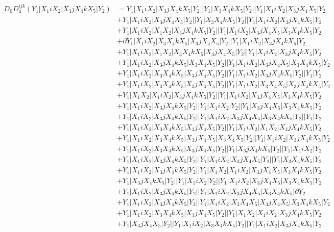 \documentclass{article}[12pt]
\begin{document}
\begin{align*}
D_0 D_3^{ijk}(Y_1|X_1iX_2|X_3jX_4kX_5|Y_2)& =Y_1|X_1iX_2|X_3jX_4kX_5|Y_2||Y_1|X_3X_4kX_5|Y_2||Y_1|X_1iX_2|X_3jX_4X_5|Y_2\\ 
 & +Y_1|X_1iX_2|X_3jX_4X_5|Y_2||Y_1|X_3X_4kX_5|Y_2||Y_1|X_1iX_2|X_3jX_4kX_5|Y_2\\ 
 & +Y_1|X_1iX_2|X_1X_2|X_3jX_4kX_5|Y_2||Y_1|X_1iX_2|X_3jX_4X_5|X_3X_4kX_5|Y_2\\ 
 & +\partial Y_1|X_1iX_2|X_3X_4kX_5|X_3jX_4X_5|Y_2||Y_1|X_1iX_2|X_3jX_4kX_5|Y_2\\ 
 & +Y_1|X_1iX_2|X_1X_2|X_3X_4kX_5|X_3jX_4X_5|Y_2||Y_1|X_1iX_2|X_3jX_4kX_5|Y_2\\ 
 & +Y_1|X_1iX_2|X_3jX_4kX_5|X_3X_4X_5|Y_2||Y_1|X_1iX_2|X_3jX_4X_5|X_3X_4kX_5|Y_2\\ 
 & +Y_1|X_1iX_2|X_3X_4kX_5|X_3jX_4X_5|Y_2||Y_1|X_1iX_2|X_3jX_4kX_5|Y_2||Y_1|Y_2\\ 
 & +Y_1|X_1iX_2|X_3X_4kX_5|X_3jX_4X_5|Y_2||Y_1|X_1iX_2|X_3X_4X_5|X_3jX_4kX_5|Y_2\\ 
 & +Y_1|X_1X_2|X_1iX_2|X_3jX_4kX_5|Y_2||Y_1|X_1iX_2|X_3jX_4X_5|X_3X_4kX_5|Y_2\\ 
 & +Y_1|X_1iX_2|X_3jX_4kX_5|Y_2||Y_1|X_1iX_2|Y_2||Y_1|X_3jX_4X_5|X_3X_4kX_5|Y_2\\ 
 & +Y_1|X_1iX_2|X_3jX_4kX_5|Y_2||Y_1|X_1iX_2|X_3jX_4X_5|X_3X_4kX_5|Y_2||Y_1|Y_2\\ 
 & +Y_1|X_1iX_2|X_3X_4kX_5|X_3jX_4X_5|Y_2||Y_1|X_1iX_2|X_1X_2|X_3jX_4kX_5|Y_2\\ 
 & +Y_1|X_1iX_2|X_3X_4kX_5|X_3jX_4X_5|X_3X_4X_5|Y_2||Y_1|X_1iX_2|X_3jX_4kX_5|Y_2\\ 
 & +Y_1|X_1iX_2|X_3X_4kX_5|X_3jX_4X_5|Y_2||Y_1|X_3jX_4kX_5|Y_2||Y_1|X_1iX_2|Y_2\\ 
 & +Y_1|X_1iX_2|X_3jX_4kX_5|Y_2||Y_1|X_1iX_2|X_3jX_4X_5|Y_2||Y_1|X_3X_4kX_5|Y_2\\ 
 & +Y_1|X_1iX_2|X_3jX_4kX_5|Y_2||Y_1|X_1X_2|X_1iX_2|X_3jX_4X_5|X_3X_4kX_5|Y_2\\ 
 & +Y_1|X_3jX_4kX_5|Y_2||Y_1|X_1iX_2|Y_2||Y_1|X_1iX_2|X_3jX_4X_5|X_3X_4kX_5|Y_2\\ 
 & +Y_1|X_1iX_2|X_3jX_4kX_5|Y_2||Y_1|X_1iX_2|X_3jX_4X_5|X_3X_4kX_5|\partial Y_2\\ 
 & +Y_1|X_1iX_2|X_3jX_4kX_5|Y_2||Y_1|X_1iX_2|X_3X_4X_5|X_3jX_4X_5|X_3X_4kX_5|Y_2\\ 
 & +Y_1|X_1iX_2|X_3X_4kX_5|X_3jX_4X_5|Y_2||Y_1|X_1X_2|X_1iX_2|X_3jX_4kX_5|Y_2\\ 
 & +Y_1|X_3jX_4X_5|Y_2||Y_1|X_1iX_2|X_3X_4kX_5|Y_2||Y_1|X_1iX_2|X_3jX_4kX_5|Y_2\\ 

\end{align*}
\end{document}

